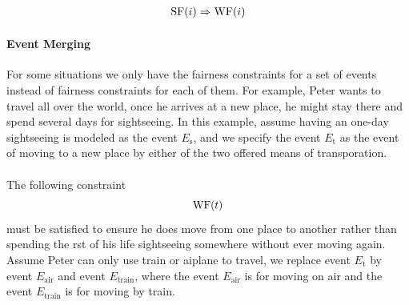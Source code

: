 \begin{gather*}
  \SF(i)\Implies \WF(i)  %
\end{gather*}

\paragraph{Event Merging}

For some situations we only have the fairness constraints for a set of events instead of fairness constraints for each of them. For example, Peter wants to travel all over the world, once he arrives at a new place, he might stay there and spend several days for sightseeing. In this example, assume having an one-day sightseeing is modeled as the event $E_{\mathrm{s}}$, and we specify the event $E_{\mathrm{t}}$ as the event of moving to a new place by either of the two offered means of transporation. \\
\setlength\fboxsep{0pt}
\setlength\fboxrule{0pt}
\\
The following constraint
\begin{displaymath}
  \mathrm{WF}(t)
\end{displaymath}
must be satisfied to ensure he does move from one place to another rather than spending the rst of his life sightseeing somewhere without ever moving again.\\
Assume Peter can only use train or aiplane to travel, we replace event $E_{\mathrm{t}}$ by event $E_{\mathrm{air}}$ and event $E_{\mathrm{train}}$, where the event $E_{\mathrm{air}}$ is for moving on air and the event $E_{\mathrm{train}}$ is for moving by train. \\
\\

